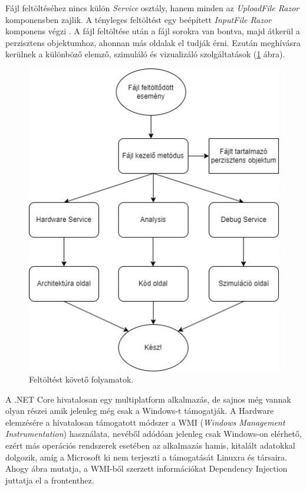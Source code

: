Fájl feltöltéséhez nincs külön \textit{Service} osztály, hanem minden az \textit{UploadFile	 Razor} komponensben zajlik. A tényleges feltöltést egy beépített \textit{InputFile Razor} komponens végzi \cite{upload}. A fájl feltöltése után a fájl sorokra van bontva, majd átkerül a perzisztens objektumhoz, ahonnan más oldalak el tudják érni. Ezután meghívásra kerülnek a különböző elemző, szimuláló és vizualizáló szolgáltatások (\ref{fig:up} ábra).

\begin{figure}[h]
\centering
\includegraphics[scale=0.8]{images/UploadFlow.jpg}
\caption{Feltöltést követő folyamatok.}
\label{fig:up}
\end{figure}

A .NET Core hivatalosan egy multiplatform alkalmazás, de sajnos még vannak olyan részei amik jelenleg még csak a Windows-t támogatják. A Hardware elemzésére a hivatalosan támogatott módszer a WMI (\textit{Windows Management Instrumentation}) használata, nevéből adódóan jelenleg csak Windows-on elérhető, ezért más operációs rendszerek esetében az alkalmazás hamis, kitalált adatokkal dolgozik, amíg a Microsoft ki nem terjeszti a támogatását Linuxra és társaira. Ahogy  ábra mutatja, a WMI-ből szerzett információkat Dependency Injection juttatja el a frontenthez.

